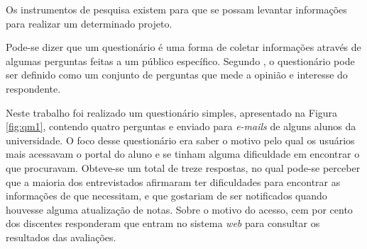 
	\par Os instrumentos de pesquisa existem para que se possam levantar
informações para realizar um determinado projeto.

	\par Pode-se dizer que um questionário é uma forma de coletar
informações através de algumas perguntas feitas a um público específico.
Segundo , o questionário pode ser definido como
um conjunto de perguntas que mede a opinião e interesse do respondente.

	\par Neste trabalho foi realizado um questionário simples, apresentado na
Figura \ref{fig:qm1}, contendo quatro perguntas e enviado para \textit{e-mails}
de alguns alunos da universidade. O foco desse questionário era saber o motivo
pelo qual os usuários mais acessavam o portal do aluno e se tinham alguma
dificuldade em encontrar o que procuravam. Obteve-se um total de treze
respostas, no qual pode-se perceber que a maioria dos entrevistados afirmaram
ter dificuldades para encontrar as informações de que necessitam, e que
gostariam de ser notificados quando houvesse alguma atualização de notas. Sobre
o motivo do acesso, cem por cento dos discentes responderam que entram no
sistema \textit{web} para consultar os resultados das avaliações.

